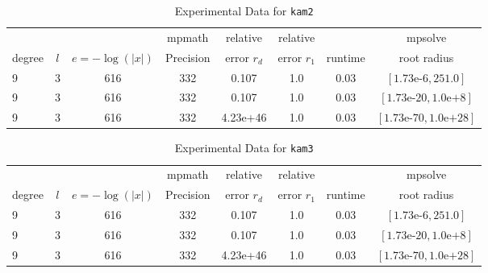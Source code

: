 \documentclass[sigconf]{acmart}
\begin{document}
\begin{table}[t]
\caption{Experimental Data for \texttt{kam2}} %
\label{tab:kam2}
\vskip -0.15in
\begin{center}
\begin{small}
\begin{sc}
\begin{tabular}{lccccccc}
\toprule
&  &  & mpmath & relative  & relative &  & mpsolve \\
degree  & $l$& $e=-\log(|x|)$& Precision &error $r_d$       & error $r_1$ &runtime& root radius\\
\midrule
 9 & 3 & 616 & 332 & 0.107 & 1.0 & 0.03 & $[1.73\text{e-}6, 251.0]$\\
 9 & 3 & 616 & 332 & 0.107 & 1.0 & 0.03 & $[1.73\text{e-}20, 1.0\text{e+}8]$\\
 9 & 3 & 616 & 332 & 4.23e+46 & 1.0 & 0.03 & $[1.73\text{e-}70, 1.0\text{e+}28]$\\
\bottomrule
\end{tabular}
\end{sc}
\end{small}
\end{center}
\vskip 0.05in
\end{table}

\begin{table}[t]
\caption{Experimental Data for \texttt{kam3}} %
\label{tab:kam3}
\vskip -0.15in
\begin{center}
\begin{small}
\begin{sc}
\begin{tabular}{lccccccc}
\toprule
&  &  & mpmath & relative  & relative &  & mpsolve \\
degree  & $l$& $e=-\log(|x|)$& Precision &error $r_d$       & error $r_1$ &runtime& root radius\\
\midrule
 9 & 3 & 616 & 332 & 0.107 & 1.0 & 0.03 & $[1.73\text{e-}6, 251.0]$\\
 9 & 3 & 616 & 332 & 0.107 & 1.0 & 0.03 & $[1.73\text{e-}20, 1.0\text{e+}8]$\\
 9 & 3 & 616 & 332 & 4.23e+46 & 1.0 & 0.03 & $[1.73\text{e-}70, 1.0\text{e+}28]$\\
\bottomrule
\end{tabular}
\end{sc}
\end{small}
\end{center}
\vskip 0.05in
\end{table}
\end{document}
